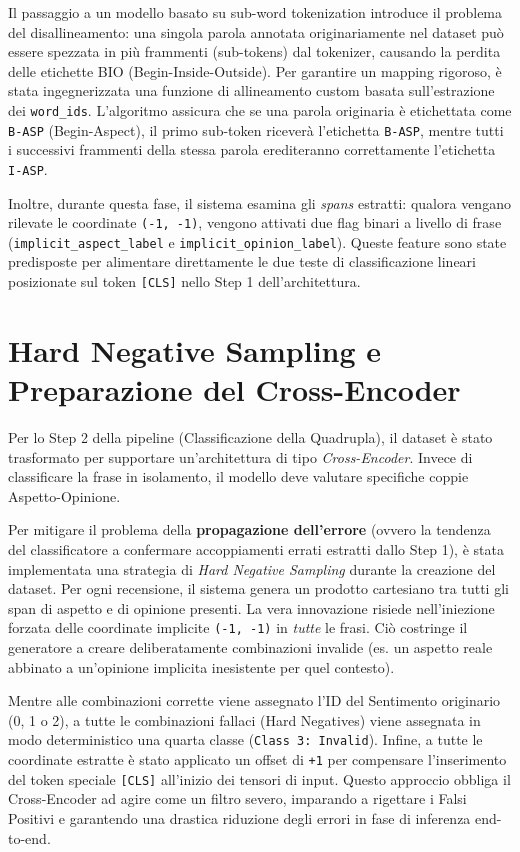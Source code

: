 \documentclass[10pt,a4paper]{report}
\begin{document}
Il passaggio a un modello basato su sub-word tokenization introduce il problema del disallineamento: una singola parola annotata originariamente nel dataset può essere spezzata in più frammenti (sub-tokens) dal tokenizer, causando la perdita delle etichette BIO (Begin-Inside-Outside).
Per garantire un mapping rigoroso, è stata ingegnerizzata una funzione di allineamento custom basata sull'estrazione dei \texttt{word\_ids}. L'algoritmo assicura che se una parola originaria è etichettata come \texttt{B-ASP} (Begin-Aspect), il primo sub-token riceverà l'etichetta \texttt{B-ASP}, mentre tutti i successivi frammenti della stessa parola erediteranno correttamente l'etichetta \texttt{I-ASP}. 

Inoltre, durante questa fase, il sistema esamina gli \textit{spans} estratti: qualora vengano rilevate le coordinate \texttt{(-1, -1)}, vengono attivati due flag binari a livello di frase (\texttt{implicit\_aspect\_label} e \texttt{implicit\_opinion\_label}). Queste feature sono state predisposte per alimentare direttamente le due teste di classificazione lineari posizionate sul token \texttt{[CLS]} nello Step 1 dell'architettura.

\section{Hard Negative Sampling e Preparazione del Cross-Encoder}
Per lo Step 2 della pipeline (Classificazione della Quadrupla), il dataset è stato trasformato per supportare un'architettura di tipo \textit{Cross-Encoder}. Invece di classificare la frase in isolamento, il modello deve valutare specifiche coppie Aspetto-Opinione.

Per mitigare il problema della \textbf{propagazione dell'errore} (ovvero la tendenza del classificatore a confermare accoppiamenti errati estratti dallo Step 1), è stata implementata una strategia di \textit{Hard Negative Sampling} durante la creazione del dataset.
Per ogni recensione, il sistema genera un prodotto cartesiano tra tutti gli span di aspetto e di opinione presenti. La vera innovazione risiede nell'iniezione forzata delle coordinate implicite \texttt{(-1, -1)} in \textit{tutte} le frasi. 
Ciò costringe il generatore a creare deliberatamente combinazioni invalide (es. un aspetto reale abbinato a un'opinione implicita inesistente per quel contesto). 

Mentre alle combinazioni corrette viene assegnato l'ID del Sentimento originario (0, 1 o 2), a tutte le combinazioni fallaci (Hard Negatives) viene assegnata in modo deterministico una quarta classe (\texttt{Class 3: Invalid}). Infine, a tutte le coordinate estratte è stato applicato un offset di \texttt{+1} per compensare l'inserimento del token speciale \texttt{[CLS]} all'inizio dei tensori di input. Questo approccio obbliga il Cross-Encoder ad agire come un filtro severo, imparando a rigettare i Falsi Positivi e garantendo una drastica riduzione degli errori in fase di inferenza end-to-end.
\end{document}
